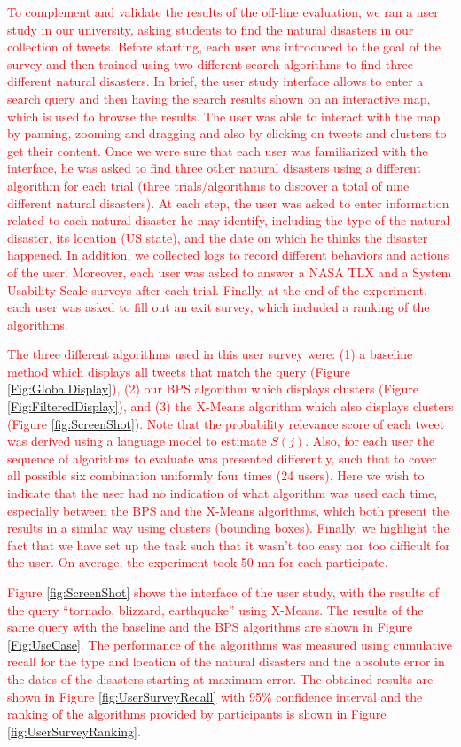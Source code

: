 \textcolor{red}{To complement and validate the results of the off-line evaluation, we ran a user study in our university, asking students to find the natural disasters in our collection of tweets. Before starting, each user was introduced to the goal of the survey and then trained using two different search algorithms to find three different natural disasters. In brief, the user study interface allows to enter a search query and then having the search results shown on an interactive map, which is used to browse the results. The user was able to interact with the map by panning, zooming and dragging and also by clicking on tweets and clusters to get their content. Once we were sure that each user was familiarized with the interface, he was asked to find three other natural disasters using a different algorithm for each trial (three trials/algorithms to discover a total of nine different natural disasters). At each step, the user was asked to enter information related to each natural disaster he may identify, including the type of the natural disaster, its location (US state), and the date on which he thinks the disaster happened. In addition, we collected logs to record different behaviors and actions of the user. Moreover, each user was asked to answer a NASA TLX and a System Usability Scale surveys after each trial. Finally, at the end of the experiment, each user was asked to fill out an exit survey, which included a ranking of the algorithms.}


\textcolor{red}{The three different algorithms used in this user survey were: (1) a baseline method which displays all tweets that match the query (Figure \ref{Fig:GlobalDisplay}), (2) our BPS algorithm which displays clusters (Figure \ref{Fig:FilteredDisplay}), and (3) the X-Means algorithm which also displays clusters (Figure \ref{fig:ScreenShot}). Note that the probability relevance score of each tweet was derived using a language model to estimate $S(j)$.
Also, for each user the sequence of algorithms to evaluate was presented differently, such that to cover all possible six combination uniformly four times (24 users). Here we wish to indicate that the user had no indication of what algorithm was used each time, especially between the BPS and the X-Means algorithms, which both present the results in a similar way using clusters (bounding boxes). Finally, we highlight the fact that we have set up the task such that it wasn't too easy nor too difficult for the user. On average, the experiment took 50 mn for each participate.}

\textcolor{red}{ Figure \ref{fig:ScreenShot} shows the interface of the user study, with the results of the query ``tornado, blizzard, earthquake''  using X-Means. The results of the same query with the baseline and the BPS algorithms are shown in Figure \ref{Fig:UseCase}.
The performance of the algorithms was measured using cumulative recall for the type and location of the natural disasters and the absolute error in the dates of the disasters starting at maximum error. The obtained results are shown in Figure \ref{fig:UserSurveyRecall} with 95\% confidence interval and the ranking of the algorithms provided by participants is shown in Figure \ref{fig:UserSurveyRanking}.}



